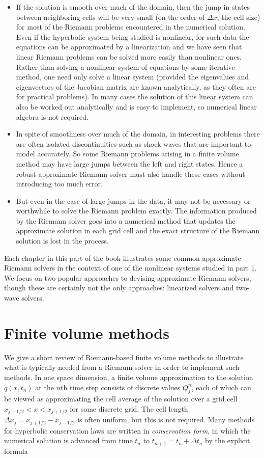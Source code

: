\documentclass{SIAMbook2016}
\begin{document}
\begin{itemize}
\item
  If the solution is smooth over much of the domain, then the jump in
  states between neighboring cells will be very small (on the order of
  \(\Delta x\), the cell size) for most of the Riemann problems
  encountered in the numerical solution. Even if the hyperbolic system
  being studied is nonlinear, for such data the equations can be
  approximated by a linearization and we have seen that linear Riemann
  problems can be solved more easily than nonlinear ones. Rather than
  solving a nonlinear system of equations by some iterative method, one
  need only solve a linear system (provided the eigenvalues and
  eigenvectors of the Jacobian matrix are known analytically, as they
  often are for practical problems). In many cases the solution of this
  linear system can also be worked out analytically and is easy to
  implement, so numerical linear algebra is not required.
\item
  In spite of smoothness over much of the domain, in interesting
  problems there are often isolated discontinuities such as shock waves
  that are important to model accurately. So some Riemann problems
  arising in a finite volume method may have large jumps between the
  left and right states. Hence a robust approximate Riemann solver must
  also handle these cases without introducing too much error.
\item
  But even in the case of large jumps in the data, it may not be
  necessary or worthwhile to solve the Riemann problem exactly. The
  information produced by the Riemann solver goes into a numerical
  method that updates the approximate solution in each grid cell and the
  exact structure of the Riemann solution is lost in the process.
\end{itemize}

Each chapter in this part of the book illustrates some common
approximate Riemann solvers in the context of one of the nonlinear
systems studied in part 1. We focus on two popular approaches to
devising approximate Riemann solvers, though these are certainly not the
only approaches: linearized solvers and two-wave solvers.

\hypertarget{finite-volume-methods}{%
\section{Finite volume methods}\label{finite-volume-methods}}

We give a short review of Riemann-based finite volume methods to
illustrate what is typically needed from a Riemann solver in order to
implement such methods. In one space dimension, a finite volume
approximation to the solution \(q(x,t_n)\) at the \(n\)th time step
consists of discrete values \(Q_j^n\), each of which can be viewed as
approximating the cell average of the solution over a grid cell
\(x_{j-1/2} < x < x_{j+1/2}\) for some discrete grid. The cell length
\(\Delta x_j = x_{j+1/2} - x_{j-1/2}\) is often uniform, but this is not
required. Many methods for hyperbolic conservation laws are written in
\emph{conservation form}, in which the numerical solution is advanced
from time \(t_n\) to \(t_{n+1} = t_n + \Delta t_n\) by the explicit
formula
\end{document}
